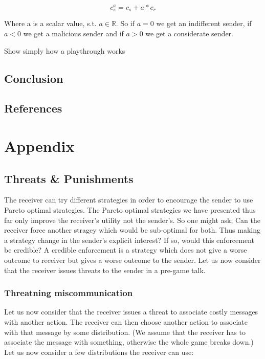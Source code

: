 \documentclass[10]{article}
\begin{document}
\begin{equation*}
c_s^a= c_s + a * c_r
\end{equation*}

Where a is a scalar value, s.t. $a \in \mathbb{R} $. So if $a=0$ we get an indifferent sender, if$a <0$ we get a malicious sender and if $a>0$ we get a considerate sender.

Show simply how a playthrough works

\subsection{Conclusion}

\subsection{References}

\section{Appendix}
\subsection{Threats \& Punishments}
The receiver can try different strategies in order to encourage the sender to use Pareto optimal strategies. The Pareto optimal strategies we have presented thus far only improve the receiver's utility not the sender's. So one might ask; Can the receiver force another stragey which would be sub-optimal for both. Thus making a strategy change in the sender's explicit interest? If so, would this enforcement be credible? A credible enforcement is a strategy which does not give a worse outcome to receiver but gives a worse outcome to the sender. Let us now consider that the receiver issues threats to the sender in a pre-game talk. %
\subsubsection{Threatning miscommunication}
Let us now consider that the receiver issues a threat to associate costly messages with another action. The receiver can then choose another action to associate with that message by some distribution. (We assume that the receiver has to associate the message with something, otherwise the whole game breaks down.) Let us now consider a few distributions the receiver can use:
\end{document}
